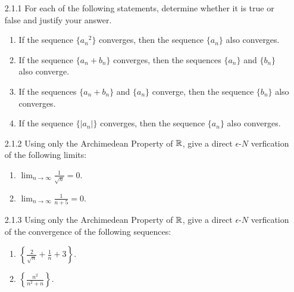 \begin{enumerate}
   \item[2.1.1]   For each of the following statements, determine whether it is
                  true or false and justify your answer.
                  \begin{enumerate}
                     \item If the sequence $\{{a_n}^2\}$ converges, then the 
                           sequence $\{a_n\}$ also converges.
                     \item If the sequence $\{a_n + b_n\}$ converges, then the
                           sequences $\{a_n\}$ and $\{b_n\}$ also converge.
                     \item If the sequences $\{a_n + b_n\}$ and $\{a_n\}$
                           converge, then the sequence $\{b_n\}$ also converges.
                     \item If the sequence $\{|a_n|\}$ converges, then the
                           sequence $\{a_n\}$ also converges.
                  \end{enumerate}
   \item[2.1.2]   Using only the Archimedean Property of $\mathbb{R}$, give a direct
                  $\epsilon$-$N$ verfication of the following limits:
                  \begin{enumerate}
                     \item $\displaystyle\lim_{n \rightarrow \infty}
                            \frac{1}{\sqrt{n}} = 0$.
                     \item $\displaystyle\lim_{n \rightarrow \infty}
                            \frac{1}{n + 5} = 0$.
                  \end{enumerate}
   \item[2.1.3]   Using only the Archimedean Property of $\mathbb{R}$, give a direct
                  $\epsilon$-$N$ verfication of the convergence of the following 
                  sequences:
                  \begin{enumerate}
                     \item $\displaystyle\left\{\frac{2}{\sqrt{n}} +
                           \frac{1}{n} + 3\right\}$.
                     \item $\displaystyle\left\{\frac{n^2}{n^2 + n}\right\}$.

\end{enumerate}
\end{enumerate}
